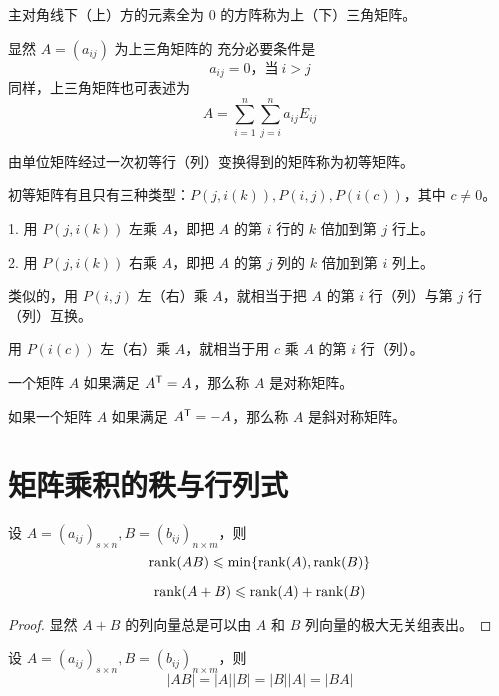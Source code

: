 \begin{definition}
	主对角线下（上）方的元素全为 $0$ 的方阵称为上（下）三角矩阵。
\end{definition}

显然 $A=(a_{ij})$ 为上三角矩阵的 充分必要条件是
\[a_{ij}=0，\text{当}\ i>j\]
同样，上三角矩阵也可表述为
\[A = \sum_{i=1}^n\sum_{j=i}^na_{ij}E_{ij}\]

\begin{definition}
	由单位矩阵经过一次初等行（列）变换得到的矩阵称为初等矩阵。
\end{definition}

初等矩阵有且只有三种类型：$P(j,i(k)),P(i,j),P(i(c))$，其中 $c\ne 0$。

1. 用 $P(j,i(k))$ 左乘 $A$，即把 $A$ 的第 $i$ 行的 $k$ 倍加到第 $j$ 行上。

2. 用 $P(j,i(k))$ 右乘 $A$，即把 $A$ 的第 $j$ 列的 $k$ 倍加到第 $i$ 列上。

类似的，用 $P(i,j)$ 左（右）乘 $A$，就相当于把 $A$ 的第 $i$ 行（列）与第 $j$ 行（列）互换。

用 $P(i(c))$ 左（右）乘 $A$，就相当于用 $c$ 乘 $A$ 的第 $i$ 行（列）。

\begin{definition}
	一个矩阵 $A$ 如果满足 ${A}^\mathsf{T} = A$，那么称 $A$ 是对称矩阵。
\end{definition}

\begin{definition}
	如果一个矩阵 $A$ 如果满足 ${A}^\mathsf{T} = -A$，那么称 $A$ 是斜对称矩阵。
\end{definition}

\section{矩阵乘积的秩与行列式}

\begin{theorem}
	设 $A = (a_{ij})_{s \times n},B = (b_{ij})_{n \times m}$，则
	\[\operatorname{rank}(AB) \leqslant \min\{\operatorname{rank}(A),\operatorname{rank}(B)\}\]
\end{theorem}

\begin{theorem}
	\[ \operatorname{rank}(A + B) \leqslant \operatorname{rank}(A) + \operatorname{rank}(B) \]
\end{theorem}

\begin{proof}
	显然 $A + B$ 的列向量总是可以由 $A$ 和 $B$ 列向量的极大无关组表出。
\end{proof}

\begin{theorem}
	设 $A = (a_{ij})_{s \times n},B = (b_{ij})_{n \times m}$，则
	\[|AB| = |A||B| = |B||A| = |BA|\]
\end{theorem}

